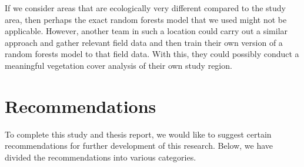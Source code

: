 \begin{itemize}
	If we consider areas that are ecologically very different compared to the study area, then perhaps the exact random forests model that we used might not be applicable. However, another team in such a location could carry out a similar approach and gather relevant field data and then train their own version of a random forests model to that field data. With this, they could possibly conduct a meaningful vegetation cover analysis of their own study region.
	
\end{itemize}

\clearpage

\section{Recommendations}

\justify
To complete this study and thesis report, we would like to suggest certain recommendations for further development of this research. Below, we have divided the recommendations into various categories. 

